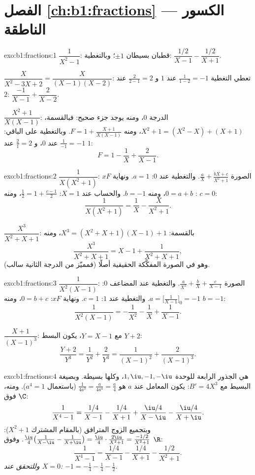 \section*{الفصل \ref{ch:b1:fractions} --- الكسور الناطقة}

\begin{solution}{exo:b1:fractions:1}
$\dfrac{1}{X^2 - 1}$: قطبان بسيطان $\pm 1$؛ وبالتغطية:
$\dfrac{1/2}{X-1} - \dfrac{1/2}{X+1}$.

$\dfrac{X}{X^2 - 3X + 2} = \dfrac{X}{(X-1)(X-2)}$: تعطي التغطية
$\frac{1}{1-2} = -1$ عند $1$ و $\frac{2}{2-1} = 2$ عند $2$:
$\dfrac{-1}{X-1} + \dfrac{2}{X-2}$.

$\dfrac{X^2+1}{X(X-1)}$: الدرجة $0$، ومنه يوجد جزء
صحيح: فبالقسمة، $X^2 + 1 = (X^2 - X) + (X + 1)$، ومنه $F = 1 +
\frac{X+1}{X(X-1)}$. وبالتغطية على الباقي: $\frac{1}{-1} = -1$
عند $0$، و $\frac{2}{1} = 2$ عند $1$:
\[
F = 1 - \frac{1}{X} + \frac{2}{X-1} .
\]
\end{solution}

\begin{solution}{exo:b1:fractions:2}
$\dfrac{1}{X(X^2+1)}$: الصورة $\frac aX + \frac{bX + c}{X^2 + 1}$.
والتغطية عند $0$: $a = 1$. ونهاية $xF$: $0 = a + b$، ومنه $b = -1$.
والحساب عند $X = 1$: $\frac12 = 1 + \frac{c - 1}{2}$، ومنه $c = 0$:
\[
\frac{1}{X(X^2+1)} = \frac 1X - \frac{X}{X^2+1} .
\]

$\dfrac{X^3}{X^2+X+1}$: بالقسمة: $X^3 = (X^2+X+1)(X - 1) + 1$، ومنه
\[
\frac{X^3}{X^2+X+1} = X - 1 + \frac{1}{X^2 + X + 1} ,
\]
وهو في الصورة المفكَّكة الحقيقية أصلًا (فمميّز  من الدرجة الثانية
سالب).
\end{solution}

\begin{solution}{exo:b1:fractions:3}
$\dfrac{1}{X^2(X-1)}$: الصورة $\frac{a}{X^2} + \frac bX +
\frac{c}{X-1}$. والتغطية عند  المضاعف $0$:
$a = \bigl[\frac{1}{X-1}\bigr]_{0} = -1$. والتغطية عند $1$: $c = 1$.
ونهاية $xF$: $0 = b + c$، ومنه $b = -1$:
\[
\frac{1}{X^2(X-1)} = -\frac{1}{X^2} - \frac1X + \frac{1}{X-1} .
\]

$\dfrac{X+1}{(X-1)^3}$: مع $Y = X - 1$، يكون البسط $Y + 2$:
\[
\frac{Y + 2}{Y^3} = \frac{1}{Y^2} + \frac{2}{Y^3}
= \frac{1}{(X-1)^2} + \frac{2}{(X-1)^3} .
\]
\end{solution}

\begin{solution}{exo:b1:fractions:4}
 هي الجذور الرابعة للوحدة $1, \iu, -1, -\iu$، وكلها
بسيطة. وبصيغة  البسيط مع $B' = 4X^3$: يكون المعامل عند $a$ هو
$\frac{1}{4a^3} = \frac{a}{4a^4} = \frac a4$ (باستعمال $a^4 = 1$). ومنه،
فوق $\C$:
\[
\frac{1}{X^4 - 1}
= \frac{1/4}{X - 1} - \frac{1/4}{X + 1}
+ \frac{\iu/4}{X - \iu} - \frac{\iu/4}{X + \iu} .
\]
وبتجميع الزوج المترافق (بالمقام المشترك $X^2 + 1$):
$\frac{\iu}{4}\bigl(\frac{1}{X-\iu} - \frac{1}{X+\iu}\bigr) =
\frac{\iu}{4}\cdot\frac{2\iu}{X^2+1} = \frac{-1/2}{X^2+1}$. وفوق
$\R$:
\[
\frac{1}{X^4 - 1}
= \frac{1/4}{X-1} - \frac{1/4}{X+1} - \frac{1/2}{X^2 + 1} .
\]
\emph{وللتحقق عند $X = 0$:} $-1 = -\frac14 - \frac14 - \frac12$.
\end{solution}

